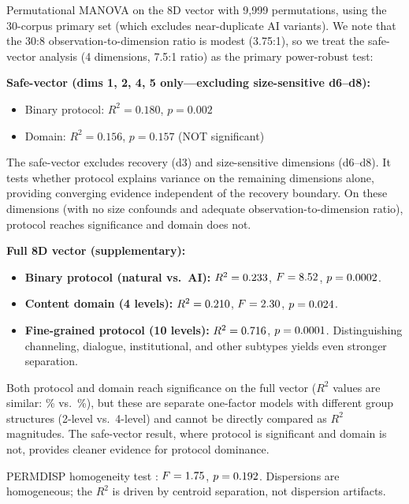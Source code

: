 \documentclass[11pt]{article}
\begin{document}
Permutational MANOVA on the 8D vector with 9,999 permutations, using the 30-corpus primary set (which excludes near-duplicate AI variants). We note that the 30:8 observation-to-dimension ratio is modest (3.75:1), so we treat the safe-vector analysis (4 dimensions, 7.5:1 ratio) as the primary power-robust test:

\textbf{Safe-vector (dims 1, 2, 4, 5 only---excluding size-sensitive d6--d8):}
\begin{itemize}
\item Binary protocol: $R^2 = 0.180$, $p = 0.002$
\item Domain: $R^2 = 0.156$, $p = 0.157$ (NOT significant)
\end{itemize}

The safe-vector excludes recovery (d3) and size-sensitive dimensions (d6--d8). It tests whether protocol explains variance on the remaining dimensions alone, providing converging evidence independent of the recovery boundary. On these dimensions (with no size confounds and adequate observation-to-dimension ratio), protocol reaches significance and domain does not.

\textbf{Full 8D vector (supplementary):}
\begin{itemize}
\item \textbf{Binary protocol (natural vs.\ AI):} $R^2 = 0.233$, $F = 8.52$, $p = 0.0002$.
\item \textbf{Content domain (4 levels):} $R^2 = 0.210$, $F = 2.30$, $p = 0.024$.
\item \textbf{Fine-grained protocol (10 levels):} $R^2 = 0.716$, $p = 0.0001$. Distinguishing channeling, dialogue, institutional, and other subtypes yields even stronger separation.
\end{itemize}

Both protocol and domain reach significance on the full vector ($R^2$ values are similar: \permProtocolPercent\% vs.\ \permDomainPercent\%), but these are separate one-factor models with different group structures (2-level vs.\ 4-level) and cannot be directly compared as $R^2$ magnitudes. The safe-vector result, where protocol is significant and domain is not, provides cleaner evidence for protocol dominance.

PERMDISP homogeneity test \citep{anderson2006distance}: $F = 1.75$, $p = 0.192$. Dispersions are homogeneous; the $R^2$ is driven by centroid separation, not dispersion artifacts.
\end{document}
